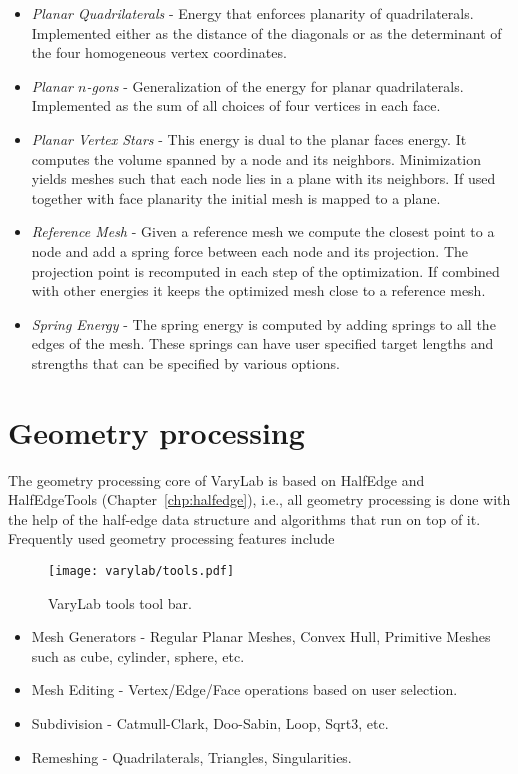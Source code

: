 \documentclass[Thesis.tex]{subfiles}
\begin{document}
\begin{itemize}
\item \emph{Planar Quadrilaterals} - Energy that enforces planarity of quadrilaterals. Implemented either as the distance of the diagonals or as the determinant of the four homogeneous vertex coordinates.
\item \emph{Planar $n$-gons} - Generalization of the energy for planar quadrilaterals. Implemented as the sum of all choices of four vertices in each face.
\item \emph{Planar Vertex Stars} - This energy is dual to the planar faces energy. It computes the volume spanned by a node and its neighbors. Minimization yields meshes such that each node lies in a plane with its neighbors. If used together with face planarity the initial mesh is mapped to a plane.
\item \emph{Reference Mesh} - Given a reference mesh we compute the closest point to a node and add a spring force between each node and its projection. The projection point is recomputed in each step of the optimization. If combined with other energies it keeps the optimized mesh close to a reference mesh.
\item \emph{Spring Energy} - The spring energy is computed by adding springs to all the edges of the mesh. These springs can have user specified target lengths and strengths that can be specified by various options.
\end{itemize}

\section{Geometry processing}

The geometry processing core of {\sc VaryLab} is based on {\sc HalfEdge} and {\sc HalfEdgeTools} (Chapter~\ref{chp:halfedge}), i.e., all geometry processing is done with the help of the half-edge data structure and algorithms that run on top of it. Frequently used geometry processing features include

\begin{figure}
    \begin{center}
    \texttt{[image: varylab/tools.pdf]}
    \caption{{\sc VaryLab} tools tool bar.}
    \label{fig:varylab_tools_ui}
    \end{center}
\end{figure}

\begin{itemize}
\item Mesh Generators - Regular Planar Meshes, Convex Hull, Primitive Meshes such as cube, cylinder, sphere, etc.
\item Mesh Editing - Vertex/Edge/Face operations based on user selection.
\item Subdivision - Catmull-Clark, Doo-Sabin, Loop, Sqrt3, etc.
\item Remeshing - Quadrilaterals, Triangles, Singularities.
\end{itemize}
\end{document}

